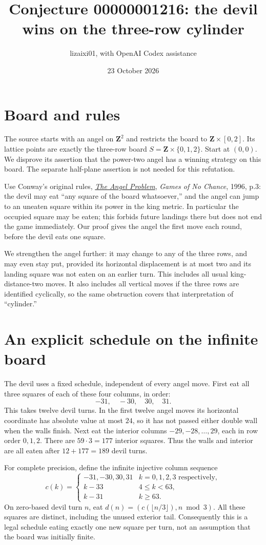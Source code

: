 \documentclass[11pt]{article}
\title{Conjecture 00000001216: the devil wins on the three-row cylinder}
\author{lizaixi01, with OpenAI Codex assistance}
\date{23 October 2026}
\begin{document}
\maketitle
\section{Board and rules}
The source starts with an angel on $\mathbf Z^2$ and restricts the board
to $\mathbf Z\times[0,2]$. Its lattice points are exactly the three-row
board $S=\mathbf Z\times\{0,1,2\}$. Start at $(0,0)$. We disprove its
assertion that the power-two angel has a winning strategy on this board.
The separate half-plane assertion is not needed for this refutation.

Use Conway's original rules, \href{https://library.slmath.org/books/Book29/files/conway.pdf}
{\emph{The Angel Problem}}, \emph{Games of No Chance}, 1996, p.3:
the devil may eat ``any square of the board whatsoever,'' and the angel
can jump to an uneaten square within its power in the king metric.
In particular the occupied square may be eaten; this forbids future
landings there but does not end the game immediately. Our proof gives
the angel the first move each round, before the devil eats one square.

We strengthen the angel further: it may change to any of the three
rows, and may even stay put, provided its horizontal displacement is
at most two and its landing square was not eaten on an earlier turn.
This includes all usual king-distance-two moves. It also includes all
vertical moves if the three rows are identified cyclically, so the
same obstruction covers that interpretation of ``cylinder.''

\section{An explicit schedule on the infinite board}
The devil uses a fixed schedule, independent of every angel move.
First eat all three squares of each of these four columns, in order:
\[
 -31,\quad -30,\quad 30,\quad 31.
\]
This takes twelve devil turns. In the first twelve angel moves its
horizontal coordinate has absolute value at most $24$, so it has not
passed either double wall when the walls finish. Next eat the interior
columns $-29,-28,\ldots,29$, each in row order $0,1,2$.
There are $59\cdot3=177$ interior squares. Thus the walls and interior
are all eaten after $12+177=189$ devil turns.

For complete precision, define the infinite injective column sequence
\[
 c(k)=\begin{cases}
 -31,-30,30,31&k=0,1,2,3\text{ respectively},\\
 k-33&4\le k<63,\\
 k-31&k\ge63.
 \end{cases}
\]
On zero-based devil turn $n$, eat
$d(n)=(c(\lfloor n/3\rfloor),n\bmod3)$.
All these squares are distinct, including the unused exterior tail.
Consequently this is a legal schedule eating exactly one new square
per turn, not an assumption that the board was initially finite.
\end{document}
